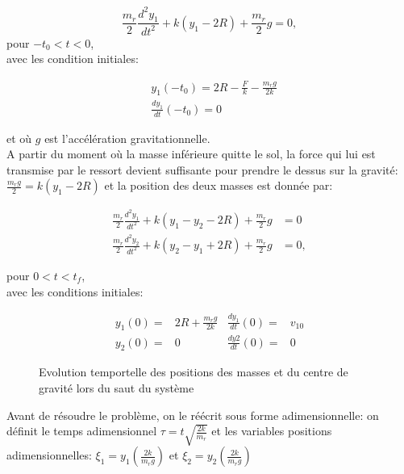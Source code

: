 \begin{equation}
    \frac{m_r}{2}\frac{d^2y_1}{dt^2}+k(y_1-2R)+\frac{m_r}{2}g=0,
  \label{eq:1}
\end{equation}
pour $-t_0<t<0$,\\

avec les condition initiales:

\begin{align}
    &y_1(-t_0)=2R-\frac{F}{k}-\frac{m_r g}{2k} \nonumber\\
    &\frac{dy_1}{dt}(-t_0)=0
\label{eq:1i}
\end{align}


et où $g$ est l'accélération gravitationnelle. \\
  
A partir du moment où la masse inférieure quitte le sol, la force qui lui est transmise par le ressort devient suffisante pour prendre le dessus sur la gravité: $\frac{m_r g}{2}=k(y_1-2R)$  et la position des deux masses est donnée par:

\begin{align}
    \frac{m_r}{2}\frac{d^2y_1}{dt^2}+k(y_1-y_2-2R)+\frac{m_r}{2}g&=0 \nonumber\\
    \frac{m_r}{2}\frac{d^2y_2}{dt^2}+k(y_2-y_1+2R)+\frac{m_r}{2}g&=0,
  \label{eq:3}
\end{align}

pour $0<t<t_f$,\\
avec les conditions initiales: 

\begin{align}
    y_1(0)=&2R+\frac{m_r g}{2k} & \frac{d y_1}{dt}(0)=&v_{10}\nonumber\\
    y_2(0)=&0 & \frac{d y2}{dt}(0)=&0
  \label{eq:4}
\end{align}    
    


\begin{figure}[htb]
\centering
\def\svgwidth{350}


\caption{Evolution temportelle des positions des masses et du centre de gravité lors du saut du système}
\label{fig:saut}
\end{figure}

Avant de résoudre le problème, on le réécrit sous forme adimensionnelle:
on définit le temps adimensionnel $\tau=t\sqrt{\frac{2k}{m_r}}$ et les variables positions adimensionnelles: $\xi_1=y_1 (\frac{2k}{m_r g})$ et $\xi_2=y_2 (\frac{2k}{m_r g})$ \\

